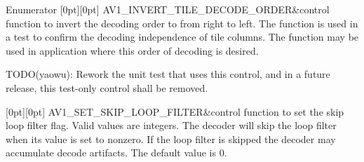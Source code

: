 \begin{DoxyEnumFields}{Enumerator}
[0pt][0pt]{}\mbox{\label{group__aom__decoder_gga3865fd4b3192489baa9a5c3632ebe97bac19ffcb187b1e1b5eee18499a97f69d2}} 
A\+V1\+\_\+\+I\+N\+V\+E\+R\+T\+\_\+\+T\+I\+L\+E\+\_\+\+D\+E\+C\+O\+D\+E\+\_\+\+O\+R\+D\+ER&control function to invert the decoding order to from right to left. The function is used in a test to confirm the decoding independence of tile columns. The function may be used in application where this order of decoding is desired.

T\+O\+D\+O(yaowu)\+: Rework the unit test that uses this control, and in a future release, this test-\/only control shall be removed. \\
\hline

[0pt][0pt]{}\mbox{\label{group__aom__decoder_gga3865fd4b3192489baa9a5c3632ebe97ba45b658bd6518cfd30c56b13e98ab168a}} 
A\+V1\+\_\+\+S\+E\+T\+\_\+\+S\+K\+I\+P\+\_\+\+L\+O\+O\+P\+\_\+\+F\+I\+L\+T\+ER&control function to set the skip loop filter flag. Valid values are integers. The decoder will skip the loop filter when its value is set to nonzero. If the loop filter is skipped the decoder may accumulate decode artifacts. The default value is 0. \\
\hline


\end{DoxyEnumFields}
